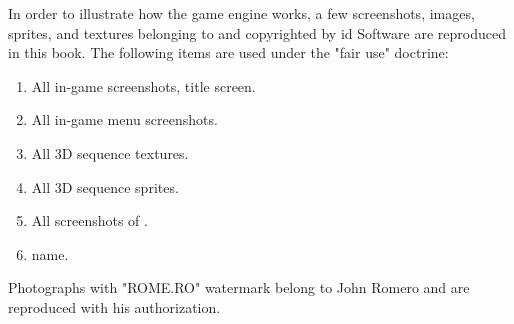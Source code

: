In order to illustrate how the \doom{} game engine works, a few screenshots, images, sprites, and textures belonging to and copyrighted by id Software are reproduced in this book. The following items are used under the "fair use" doctrine:\\
\par
\begin{enumerate}
	\item All in-game screenshots, title screen.
	\item All in-game menu screenshots.
	\item All 3D sequence textures.
    \item All 3D sequence sprites.
    \item All screenshots of \doom.
    \item \doom{}name.
\end{enumerate}
\par
Photographs with "ROME.RO" watermark belong to John Romero and are reproduced with his authorization.
